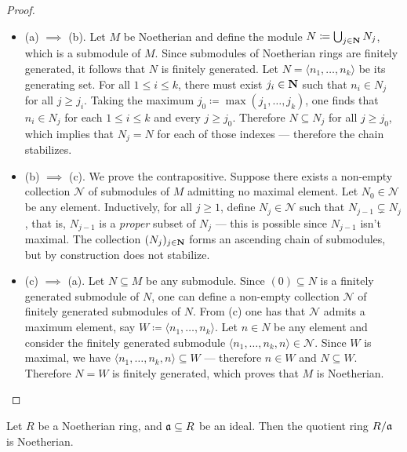 \begin{proof}
\begin{itemize}\setlength\itemsep{0em}
\item (a) \(\implies\) (b). Let \(M\) be Noetherian and define the module
  \(N \coloneq \bigcup_{j \in \mathbf{N}} N_j\), which is a submodule of \(M\). Since
  submodules of Noetherian rings are finitely generated, it follows that \(N\)
  is finitely generated. Let \(N = \langle n_1, \dots, n_k \rangle\) be its
  generating set. For all \(1 \leq i \leq k\), there must exist \(j_i \in \mathbf{N}\)
  such that \(n_i \in N_j\) for all \(j \geq j_i\). Taking the maximum
  \(j_0 \coloneq \max(j_1, \dots, j_k)\), one finds that \(n_i \in N_j\) for
  each \(1 \leq i \leq k\) and every \(j \geq j_0\). Therefore
  \(N \subseteq N_j\) for all \(j \geq j_0\), which implies that \(N_j = N\) for
  each of those indexes --- therefore the chain stabilizes.

\item (b) \(\implies\) (c). We prove the contrapositive. Suppose there exists a
  non-empty collection \(\mathcal{N}\) of submodules of \(M\) admitting no
  maximal element. Let \(N_0 \in \mathcal{N}\) be any element. Inductively, for
  all \(j \geq 1\), define \(N_j \in \mathcal{N}\) such that \(N_{j-1}
  \subsetneq N_j\), that is, \(N_{j-1}\) is a \emph{proper} subset of \(N_j\)
  --- this is possible since \(N_{j-1}\) isn't maximal. The collection
  \((N_j)_{j \in \mathbf{N}}\) forms an ascending chain of submodules, but by
  construction does not stabilize.

\item (c) \(\implies\) (a). Let \(N \subseteq M\) be any submodule. Since
  \((0) \subseteq N\) is a finitely generated submodule of \(N\), one can define
  a non-empty collection \(\mathcal{N}\) of finitely generated submodules of
  \(N\). From (c) one has that \(\mathcal{N}\) admits a maximum element, say
  \(W \coloneq \langle n_1, \dots, n_k \rangle\). Let \(n \in N\) be any element
  and consider the finitely generated submodule \(\langle n_1, \dots, n_k, n
  \rangle \in \mathcal{N}\). Since \(W\) is maximal, we have \(\langle n_1,
  \dots, n_k, n \rangle \subseteq W\) --- therefore \(n \in W\) and \(N
  \subseteq W\). Therefore \(N = W\) is finitely generated, which proves that
  \(M\) is Noetherian.
\end{itemize}
\end{proof}

\begin{lemma}
\label{lem:quotient-is-noetherian}
Let \(R\) be a Noetherian ring, and \(\mathfrak{a} \subseteq R\) be an ideal. Then
the quotient ring \(R/\mathfrak{a}\) is Noetherian.
\end{lemma}

